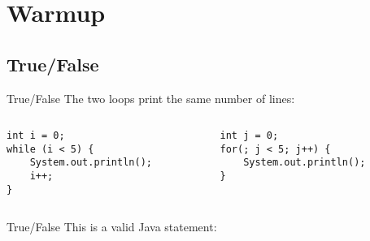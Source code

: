 \documentclass[9pt]{beamer}
\title{\themidterm}
\author{\theauthors}
\institute{\theorganization}
\date{\thedate}
\begin{document}

\begin{frame}
  \titlepage
\end{frame}

\section{Warmup}
\subsection{True/False}
\begin{frame}[fragile]{True/False}
  The two loops print the same number of lines:

  \begin{columns}
    \begin{column}{0.5\textwidth}
      \begin{lstlisting}
int i = 0;
while (i < 5) {
    System.out.println();
    i++;
}
      \end{lstlisting}
    \end{column}
    \begin{column}{0.5\textwidth}
      \begin{lstlisting}
int j = 0;
for(; j < 5; j++) {
    System.out.println();
}
      \end{lstlisting}
    \end{column}
  \end{columns}

\end{frame}


\begin{frame}[fragile]{True/False}
  This is a valid Java statement:

  \multiarrayA



\end{frame}
\end{document}
